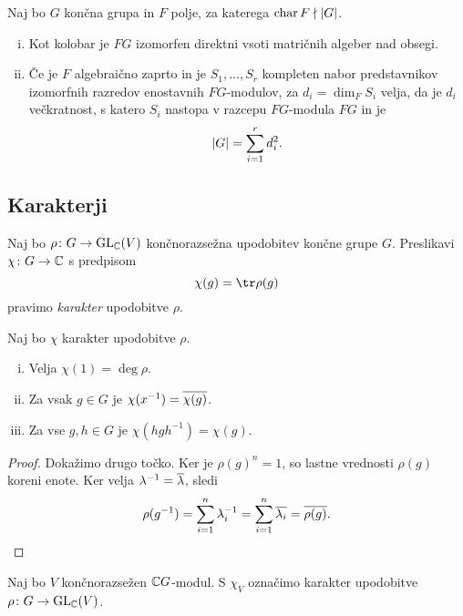 \begin{posledica}
Naj bo $G$ končna grupa in $F$ polje, za katerega
$\operatorname{char} F \nmid \left\lvert G\right\rvert$.

\begin{enumerate}[i)]
\item Kot kolobar je $FG$ izomorfen direktni vsoti matričnih
algeber nad obsegi.
\item Če je $F$ algebraično zaprto in je $S_1, \dots, S_r$
kompleten nabor predstavnikov izomorfnih razredov enostavnih
$FG$-modulov, za $d_i = \dim_F S_i$ velja, da je $d_i$ večkratnost,
s katero $S_i$ nastopa v razcepu $FG$-modula $FG$ in je
\[
\left\lvert G\right\rvert = \sum_{i=1}^r d_i^2.
\]
\end{enumerate}
\end{posledica}

\newpage

\subsection{Karakterji}

\begin{definicija}
Naj bo $\rho \colon G \to \operatorname{GL}_{\mathbb{C}}(V)$ končnorazsežna upodobitev
končne grupe $G$. Preslikavi $\chi \colon G \to \mathbb{C}$ s predpisom
\[
\chi(g) = \tr \rho(g)
\]
pravimo \emph{karakter} upodobitve
$\rho$.
\end{definicija}

\begin{trditev}
Naj bo $\chi$ karakter upodobitve $\rho$.

\begin{enumerate}[i)]
\item Velja $\chi(1) = \deg \rho$.
\item Za vsak $g \in G$ je $\chi (x^{-1}) = \overline{\chi(g)}$.
\item Za vse $g, h \in G$ je $\chi(hgh^{-1}) = \chi(g)$.
\end{enumerate}
\end{trditev}

\begin{proof}
Dokažimo drugo točko. Ker je $\rho(g)^n = 1$, so lastne vrednosti
$\rho(g)$ koreni enote. Ker velja $\lambda^{-1} = \overline{\lambda}$,
sledi
\[
\rho(g^{-1}) = \sum_{i=1}^n \lambda_i^{-1} =
\sum_{i=1}^n \overline{\lambda_i} = \overline{\rho(g)}. \qedhere
\]
\end{proof}

\begin{definicija}
Naj bo $V$ končnorazsežen $\mathbb{C} G$-modul. S $\chi_V$ označimo
karakter upodobitve $\rho \colon G \to \operatorname{GL}_{\mathbb{C}}(V)$.
\end{definicija}

